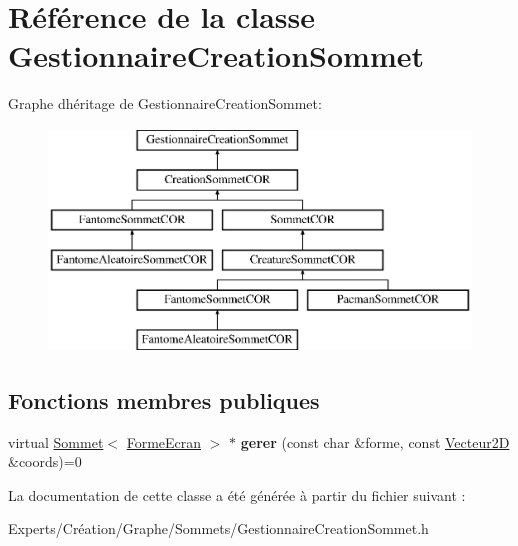 \hypertarget{class_gestionnaire_creation_sommet}{}\section{Référence de la classe Gestionnaire\+Creation\+Sommet}
\label{class_gestionnaire_creation_sommet}
Graphe d\textquotesingle{}héritage de Gestionnaire\+Creation\+Sommet\+:\begin{figure}[H]
\begin{center}
\leavevmode
\includegraphics[height=5.925926cm]{class_gestionnaire_creation_sommet}
\end{center}
\end{figure}
\subsection*{Fonctions membres publiques}
\begin{DoxyCompactItemize}
\item 
\mbox{\label{class_gestionnaire_creation_sommet_a1919b294b887182c36e961fbfcc2c7ac}} 
virtual \mbox{\hyperlink{class_sommet}{Sommet}}$<$ \mbox{\hyperlink{class_forme_ecran}{Forme\+Ecran}} $>$ $\ast$ {\bfseries gerer} (const char \&forme, const \mbox{\hyperlink{class_vecteur2_d}{Vecteur2D}} \&coords)=0
\end{DoxyCompactItemize}


La documentation de cette classe a été générée à partir du fichier suivant \+:\begin{DoxyCompactItemize}
\item 
Experts/\+Création/\+Graphe/\+Sommets/Gestionnaire\+Creation\+Sommet.\+h\end{DoxyCompactItemize}
